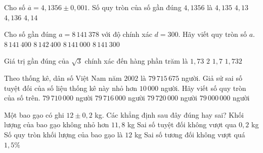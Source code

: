 \begin{ex}%
	Cho  số $\overline{a}=4{,}1356\pm 0{,}001$. Số quy tròn của số gần đúng $ 4{,}1356$ là
	\choice 
		{$  4{,}135$}
		{$  4{,}13$}
		 {$ 4{,}136$}
		{\True $ 4{,}14$} 
\end{ex}

\begin{ex}%
	Cho số gần đúng $a=8\,141\,378$ với độ chính xác $d=300$. Hãy viết quy tròn số  $a$.
	 \choice
		{$8\,141\,400$} 
		{$8\,142\,400$} 
		 {\True $8\,141\,000$}
		 {$8\,141\,300$}
\end{ex}

\begin{ex}%
	Giá trị gần đúng của $\sqrt{3}$ chính xác đến  hàng phần trăm là
	 \choice
		{\True $1{,}73$} 
		{$2$} 
		{$1{,}7$} 
		{$1{,}732$} 
\end{ex}

\begin{ex}%
	Theo thống kê, dân số Việt Nam năm $ 2002$ là $ 79\, 715 \, 675$ người. Giả sử sai số tuyệt đối của số liệu thống kê này nhỏ hơn $ 10\, 000$ người. Hãy viết  số quy tròn của số trên.
	 \choice
		{$ 79\, 710\, 000$ người} 
		{$  79\, 716\, 000$ người}
		{\True $ 79\, 720\, 000$  người}
		{$ 79\, 000\, 000$ người} 
\end{ex}



\begin{ex}%
	Một  bao gạo có ghi $12 \pm 0{,}2$ kg.
	Các khẳng định  sau đây đúng hay sai?
	\choiceTF 
		{\True Khối lượng của bao gạo không nhỏ hơn $11,8$  kg}
		{\True Sai số tuyệt đối không vượt  qua $0{,}2$ kg}
		{\True Số  quy tròn khối lượng của bao gạo là $12$ kg}
		{Sai  số tương đối không vượt quá $1{,}5\%$}
\end{ex}


